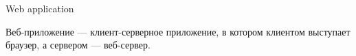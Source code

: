 \begin{frame}{Web application}
  \begin{center}
    Веб-приложение — клиент-серверное приложение, в котором клиентом выступает браузер, а сервером — веб-сервер.
  \end{center}
\end{frame}